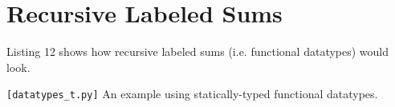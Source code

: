 \documentclass[10pt,preprint]{sigplanconf}
\begin{document}
{\section{Recursive Labeled Sums}
Listing 12 shows how recursive labeled sums (i.e. functional datatypes) would look.
\begin{codelisting}

\caption{\texttt{[datatypes\_t.py]} An example using statically-typed functional datatypes.}
\label{datatypest}
\end{codelisting}
%
%
%
}
\end{document}
